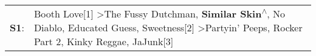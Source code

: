 \begin{supertabular}{p{0.03\textwidth}p{0.92\textwidth}}
 \textbf{S1}:  &  Booth Love[1]\textsuperscript{} \textgreater \enspace The Fussy Dutchman\textsuperscript{}, \enspace \textbf{Similar Skin\textsuperscript{$\wedge$}}, \enspace No Diablo\textsuperscript{}, \enspace Educated Guess\textsuperscript{}, \enspace Sweetness[2]\textsuperscript{} \textgreater \enspace Partyin' Peeps\textsuperscript{}, \enspace Rocker Part 2\textsuperscript{}, \enspace Kinky Reggae\textsuperscript{}, \enspace JaJunk[3]\textsuperscript{}  \enspace  \\
\end{supertabular}
